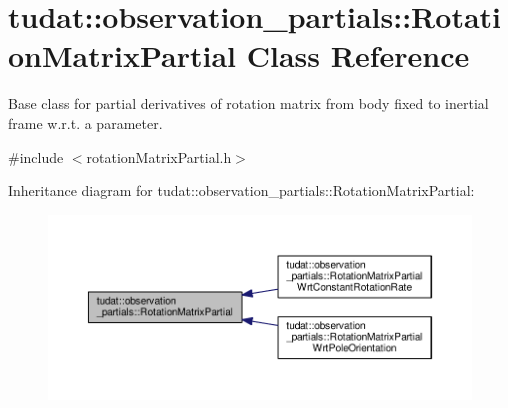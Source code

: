 \hypertarget{classtudat_1_1observation__partials_1_1RotationMatrixPartial}{}\section{tudat\+:\+:observation\+\_\+partials\+:\+:Rotation\+Matrix\+Partial Class Reference}
\label{classtudat_1_1observation__partials_1_1RotationMatrixPartial}


Base class for partial derivatives of rotation matrix from body fixed to inertial frame w.\+r.\+t. a parameter.  




{\ttfamily \#include $<$rotation\+Matrix\+Partial.\+h$>$}



Inheritance diagram for tudat\+:\+:observation\+\_\+partials\+:\+:Rotation\+Matrix\+Partial\+:
\nopagebreak
\begin{figure}[H]
\begin{center}
\leavevmode
\includegraphics[width=350pt]{classtudat_1_1observation__partials_1_1RotationMatrixPartial__inherit__graph}
\end{center}
\end{figure}
